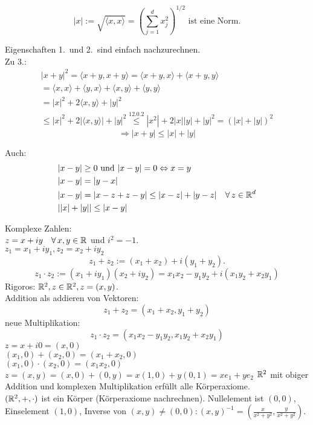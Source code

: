\documentclass[../ana1.tex]{subfiles}
\begin{document}
\begin{satz}
	\[ |x| := \sqrt{\langle x,x\rangle} = {\left(\sum_{j=1}^{d} x_j^2\right)}^{1/2} \text{ ist eine Norm}. \]
\end{satz}
\begin{bew}
	Eigenschaften 1.\ und 2.\ sind einfach nachzurechnen.\\
	Zu 3.:
	\begin{align*}
		|x+y|^2 = \langle x+y,x+y\rangle=\langle x+y,x\rangle+\langle x+y,y\rangle \\
		= \langle x,x\rangle + \langle y,x\rangle + \langle x,y\rangle + \langle y,y\rangle \\
		=|x|^2 + 2\langle x,y\rangle + |y|^2\\
		\leq |x|^2 + 2|\langle x,y\rangle| + |y|^2 \overset{12.0.2}{\leq} |x^2| + 2|x||y| + |y|^2 = {(|x|+|y|)}^2
	\end{align*}
	\[ \Rightarrow |x+y| \leq |x| + |y| \]
\end{bew}
\begin{bem}
	Auch:
	\begin{align*}
		&|x - y| \geq 0 \text{ und } |x - y| = 0 \Leftrightarrow x = y\\
		&|x - y| = |y - x|\\
		&|x - y| = |x-z + z-y| \leq |x - z| + |y - z| \quad \forall z \in \R^d\\
		&||x| + |y|| \leq |x - y|
	\end{align*}
\end{bem}
Komplexe Zahlen:\\
\( z=x+iy \quad\forall x,y\in\R \) und \( i^2 = -1 \).\\
\( z_1 = x_1 + i y_1, z_2 = x_2 + i y_2 \)
\[ z_1 + z_2 := (x_1 + x_2) + i(y_1 + y_2). \]
\[ z_1 \cdot z_2 := (x_1 + i y_1)(x_2 + i y_2) = x_1x_2 - y_1y_2 + i(x_1y_2 + x_2y_1) \]
Rigoros: \( \mathbb{R}^2, z\in\mathbb{R}^2, z=(x,y) \).\\
Addition als addieren von Vektoren: \[ z_1 + z_2 = (x_1 + x_2, y_1 + y_2) \]
neue Multiplikation: \[ z_1 \cdot z_2 = (x_1 x_2 - y_1y_2, x_1y_2 + x_2y_1) \]
\( z = x+i 0 = (x,0) \) \\
\( (x_1,0) + (x_2,0) = (x_1+x_2,0) \) \\
\( (x_1,0)\cdot(x_2,0) = (x_1x_2,0) \) \\
\( z=(x,y) = (x,0) + (0,y) = x(1,0) + y(0,1) = x e_1 + y e_2 \)
\( \mathbb{R}^2 \) mit obiger Addition und \glqq{}komplexen\grqq{} Multiplikation erfüllt alle Körperaxiome.\\
\( (\mathbb{R}^2, +, \cdot) \) ist ein Körper (Körperaxiome nachrechnen). Nullelement ist \( (0,0) \), Einselement \((1,0)\), Inverse von \(  (x,y) \neq (0,0): {(x,y)}^{-1} = (\frac{x}{x^2+y^2}, \frac{y}{x^2+y^2}) \).
\end{document}
